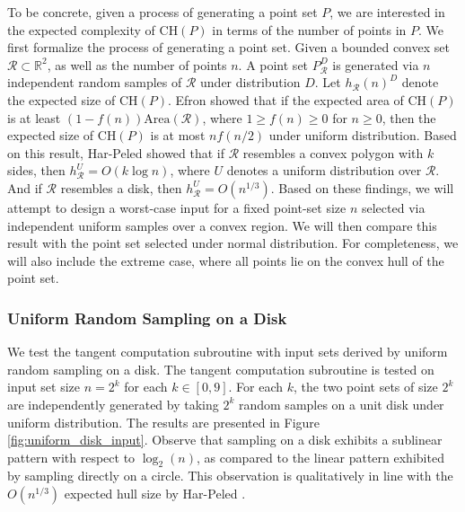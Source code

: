 \documentclass{article}
\newcommand{\figref}[1]{Figure \ref{#1}}
\newcommand{\CH}{\mathrm{CH}}
\begin{document}
To be concrete, given a process of generating a point set $P$, we are interested in the expected complexity of $\CH(P)$ in terms of the number of points in $P$. We first formalize the process of generating a point set. Given a bounded convex set $\mathcal{R} \subset \mathbb{R}^2$, as well as the number of points $n$. A point set $P_\mathcal{R}^D$ is generated via $n$ independent random samples of $\mathcal{R}$ under distribution $D$. Let $h_\mathcal{R}(n)^D$ denote the expected size of $\CH(P)$. Efron \cite{efr65} showed that if the expected area of $\CH(P)$ is at least $(1-f(n)) \mathrm{Area}(\mathcal{R})$, where $1 \geq f(n) \geq 0$ for $n \geq 0$, then the expected size of $\CH(P)$ is at most $nf(n/2)$ under uniform distribution. Based on this result, Har-Peled \cite{hp11} showed that if $\mathcal{R}$ resembles a convex polygon with $k$ sides, then $h_\mathcal{R}^U = O(k \log n)$, where $U$ denotes a uniform distribution over $\mathcal{R}$. And if $\mathcal{R}$ resembles a disk, then $h_\mathcal{R}^U = O(n^{1/3})$. Based on these findings, we will attempt to design a worst-case input for a fixed point-set size $n$ selected via independent uniform samples over a convex region. We will then compare this result with the point set selected under normal distribution. For completeness, we will also include the extreme case, where all points lie on the convex hull of the point set.

\subsubsection{Uniform Random Sampling on a Disk}

We test the tangent computation subroutine with input sets derived by uniform random sampling on a disk. The tangent computation subroutine is tested on input set size $n = 2^k$ for each $k \in [0, 9]$. For each $k$, the two point sets of size $2^k$ are independently generated by taking $2^k$ random samples on a unit disk under uniform distribution. The results are presented in \figref{fig:uniform_disk_input}. Observe that sampling on a disk exhibits a sublinear pattern with respect to $\log_2(n)$, as compared to the linear pattern exhibited by sampling directly on a circle. This observation is qualitatively in line with the $O(n^{1/3})$ expected hull size by Har-Peled \cite{hp11}.
\end{document}
